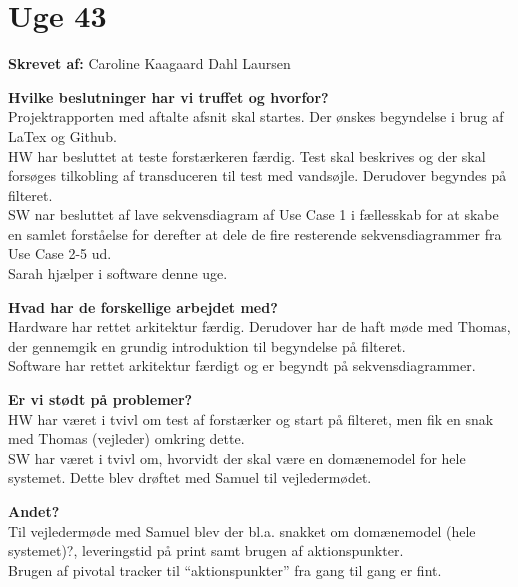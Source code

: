 \section{Uge 43}

\textbf{Skrevet af:}
Caroline Kaagaard Dahl Laursen

\textbf{Hvilke beslutninger har vi truffet og hvorfor? } \\
Projektrapporten med aftalte afsnit skal startes. Der ønskes begyndelse i brug af LaTex og Github. \\
HW har besluttet at teste forstærkeren færdig. Test skal beskrives og der skal forsøges tilkobling af transduceren til test med vandsøjle. Derudover begyndes på filteret. \\
SW nar besluttet af lave sekvensdiagram af Use Case 1 i fællesskab for at skabe en samlet forståelse for derefter at dele de fire resterende sekvensdiagrammer fra Use Case 2-5 ud. \\
Sarah hjælper i software denne uge.

\textbf{Hvad har de forskellige arbejdet med? } \\
Hardware har rettet arkitektur færdig. Derudover har de haft møde med Thomas, der gennemgik en grundig introduktion til begyndelse på filteret. \\
Software har rettet arkitektur færdigt og er begyndt på sekvensdiagrammer. 

\textbf{Er vi stødt på problemer?} \\ 
HW har været i tvivl om test af forstærker og start på filteret, men fik en snak med Thomas (vejleder) omkring dette. \\
SW har været i tvivl om, hvorvidt der skal være en domænemodel for hele systemet. Dette blev drøftet med Samuel til vejledermødet. 

\textbf{Andet?} \\
Til vejledermøde med Samuel blev der bl.a. snakket om domænemodel (hele systemet)?, leveringstid på print samt brugen af aktionspunkter. \\
Brugen af pivotal tracker til “aktionspunkter” fra gang til gang er fint.

\clearpage
